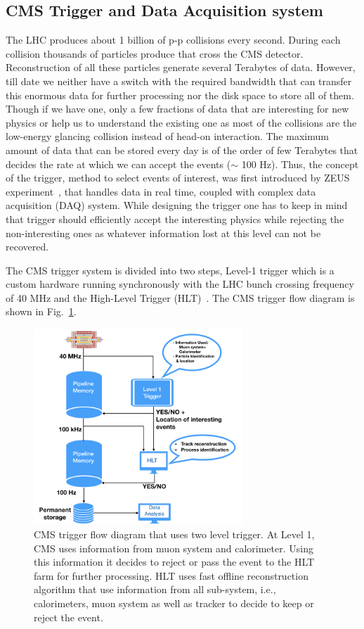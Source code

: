 {{{\subsection{CMS Trigger and Data Acquisition system} %
\label{sub:cms_trigger_and_data_acquisition_system}
The LHC produces about 1 billion of p-p collisions every second. During each collision thousands of particles produce that cross the CMS detector. Reconstruction of all these particles generate several Terabytes of data. However, till date we neither have a switch with the required bandwidth that can transfer this enormous data for further processing nor the disk space to store all of them. Though if we have one, only a few fractions of data that are interesting for new physics or help us to understand the existing one as most of the collisions are the low-energy glancing collision instead of head-on interaction. The maximum amount of data that can be stored every day is of the order of few Terabytes that decides the rate at which we can accept the events ($\sim$ 100 Hz). Thus, the concept of the trigger, method to select events of interest, was first introduced by ZEUS experiment~\cite{ZEUSCollaboration1993}, that handles data in real time, coupled with complex data acquisition (DAQ) system. While designing the trigger one has to keep in mind that trigger should efficiently accept the interesting physics  while rejecting the non-interesting ones as whatever information lost at this level can not be recovered.


The CMS trigger system is divided into two steps, Level-1 trigger which is a custom hardware running synchronously with the LHC bunch crossing frequency of 40 MHz and the High-Level Trigger (HLT)~\cite{paper:JINST:CMSCollaboration,Cittolin:578006,Khachatryan2017}. The CMS trigger flow diagram is shown in Fig.~\ref{fig:cms-trigger}. 
\begin{figure}[!htbp]
	\centering
	\includegraphics[width=0.70\textwidth,height=0.53\textwidth]{figures/LHC/Trigger-flow-diagram.jpeg}
	\caption{CMS trigger flow diagram that uses two level trigger. At Level 1, CMS uses information from muon system and calorimeter. Using this information it decides to reject  or pass the event to the HLT farm for further processing. HLT uses fast offline reconstruction algorithm that use information from all sub-system, i.e., calorimeters, muon system as well as tracker to decide to keep or reject the event.}
	\label{fig:cms-trigger}
\end{figure}

}}}
